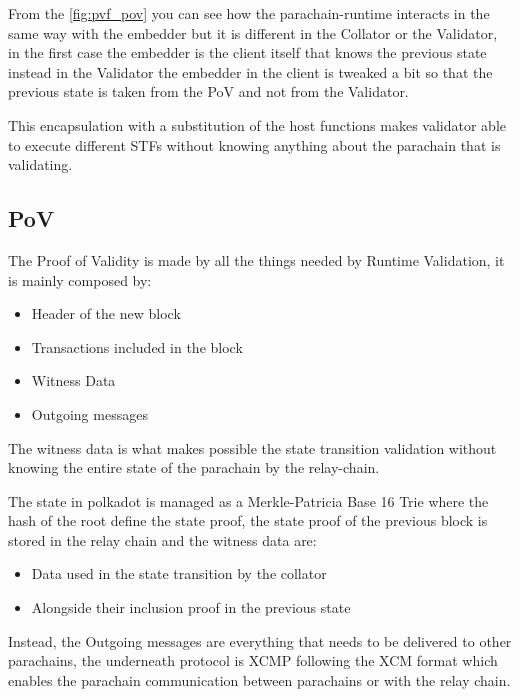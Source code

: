 
From the \ref{fig:pvf_pov} you can see how the parachain-runtime interacts in the same way with the embedder but it is different in the Collator or the Validator, in the first case the embedder is the client itself that knows the previous state instead in the Validator the embedder in the client is tweaked a bit so that the previous state is taken from the PoV and not from the Validator.

This encapsulation with a substitution of the host functions makes  validator able to execute different STFs without knowing anything about the parachain that is validating.

\subsection{PoV}

The Proof of Validity is made by all the things needed by Runtime Validation, it is mainly composed by:~\cite{cumulus-docs}

\begin{itemize}
  \item Header of the new block
  \item Transactions included in the block
  \item Witness Data
  \item Outgoing messages
\end{itemize}

The witness data is what makes possible the state transition validation without knowing the entire state of the parachain by the relay-chain.

The state in polkadot is managed as a Merkle-Patricia Base 16 Trie where the hash of the root define the state proof, the state proof of the previous block is stored in the relay chain and the witness data are:


\begin{itemize}
  \item Data used in the state transition by the collator
  \item Alongside their inclusion proof in the previous state
\end{itemize}

Instead, the Outgoing messages are everything that needs to be delivered to other parachains, the underneath protocol is XCMP following the XCM format which enables the parachain communication between parachains or with the relay chain.

